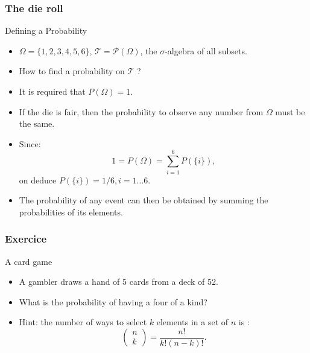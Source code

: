 \begin{frame}
    \frametitle{The die roll}
\begin{block}{Defining a Probability}
    \begin{itemize}
        \item<+-> $\Omega = \{1,2,3,4,5,6\}$, $\mathcal{T} = \mathcal{P}\left( \Omega \right)$, 
        the $\sigma$-algebra of all subsets. 
        \item<+-> How to find a probability on $\mathcal{T}$ ?
        \item<+-> It is required that $P\left( \Omega \right) = 1.$
        \item<+-> If the die is fair, then the probability to observe any number
        from $\Omega$ must be the same.
        \item<+-> Since:
        \begin{equation}
            1 = P\left( \Omega \right) = \sum_{i=1}^6 P\left( \{i\} \right),
        \end{equation}
        on deduce $P\left( \{i\} \right) = 1/6, i=1 \dots 6.$
        \item<+-> The probability of any event can then be obtained by summing the probabilities
        of its elements. 
    \end{itemize}
\end{block}
\end{frame}
\begin{frame}
    \frametitle{Exercice}
\begin{block}{A card game}
   \begin{itemize}
    \item<+-> A gambler draws a hand of 5 cards from a deck of 52.
    \item<+-> What is the probability of having a four of a kind?
    \item<+-> Hint: the number of ways to select $k$ elements in a set of $n$
    is :
    \begin{equation}
        \begin{pmatrix}
            n \\ k
        \end{pmatrix} = \frac{n!}{k!\left( n-k \right)!}.
    \end{equation}
   \end{itemize} 
\end{block}
    

\end{frame}
